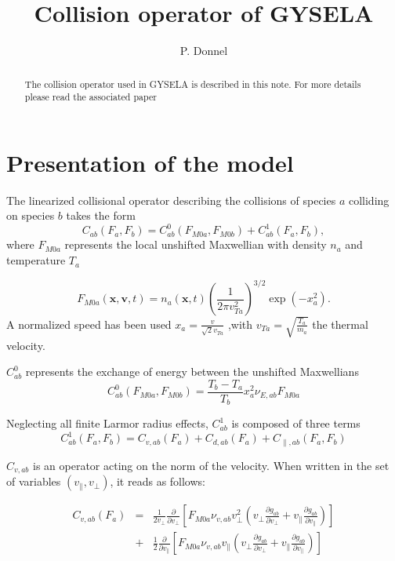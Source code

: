 \documentclass[11pt,preprint]{elsarticle}
\begin{document}
\begin{frontmatter}



\title{Collision operator of GYSELA}


\author{P. Donnel}


\begin{abstract}
The collision operator used in GYSELA is described in this note. For more details please read the associated paper \cite{Donnel_CPC_2019}
\end{abstract}

\end{frontmatter}


\section{Presentation of the model}

The linearized collisional operator describing the collisions of species
$a$ colliding on species $b$ takes the form
\[
C_{ab}(F_{a},F_{b})=C_{ab}^{0}(F_{M0a},F_{M0b})+C_{ab}^{1}(F_{a},F_{b}) ,
\]
where $F_{M0a}$ represents the local unshifted Maxwellian with density
$n_{a}$ and temperature $T_{a}$

\[
F_{M0a}(\boldsymbol{x},\boldsymbol{v},t)=n_{a}(\boldsymbol{x},t)\left(\frac{1}{2\pi v_{Ta}^{\text{2}}}\right)^{3/2}\exp\left(-x_{a}^{2}\right) .
\]
A normalized speed has been used $x_{a}=\frac{v}{\sqrt{2}v_{Ta}}$
,with $v_{Ta}=\sqrt{\frac{T_{a}}{m_{a}}}$ the thermal velocity. 

$C_{ab}^{0}$ represents the exchange of energy between the unshifted
Maxwellians
\[
C_{ab}^{0}(F_{M0a},F_{M0b})=\frac{T_{b}-T_{a}}{T_{b}}x_{a}^{2}\nu_{E,ab}F_{M0a}
\]


Neglecting all finite Larmor radius effects, $C_{ab}^{1}$ is composed
of three terms 
\[
C_{ab}^{1}(F_{a},F_{b})=C_{v,ab}(F_{a})+C_{d,ab}(F_{a})+C_{\parallel,ab}(F_{a},F_{b})
\]


$C_{v,ab}$ is an operator acting on the norm of the velocity. When
written in the set of variables $\left(v_{\parallel},v_{\perp}\right)$,
it reads as follows:

\begin{eqnarray*}
C_{v,ab}\left(F_{a}\right) & = & \frac{1}{2v_{\perp}}\frac{\partial}{\partial v_{\perp}}\left[F_{M0a}\nu_{v,ab}v_{\perp}^{2}\left(v_{\perp}\frac{\partial g_{ab}}{\partial v_{\perp}}+v_{\parallel}\frac{\partial g_{ab}}{\partial v_{\parallel}}\right)\right]\\
 & + & \frac{1}{2}\frac{\partial}{\partial v_{\parallel}}\left[F_{M0a}\nu_{v,ab}v_{\parallel}\left(v_{\perp}\frac{\partial g_{ab}}{\partial v_{\perp}}+v_{\parallel}\frac{\partial g_{ab}}{\partial v_{\parallel}}\right)\right]
\end{eqnarray*}
\end{document}
